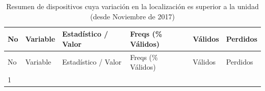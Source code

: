 \documentclass[]{book}
\begin{document}
\begin{longtable}[]{@{}llllll@{}}
\caption{\label{tabs:all-locations-diff-from-november-summary}Resumen de
dispositivos cuya variación en la localización es superior a la unidad
(desde Noviembre de 2017)}\tabularnewline
\toprule
\begin{minipage}[b]{0.05\columnwidth}\raggedright\strut
No\strut
\end{minipage} & \begin{minipage}[b]{0.11\columnwidth}\raggedright\strut
Variable\strut
\end{minipage} & \begin{minipage}[b]{0.29\columnwidth}\raggedright\strut
Estadístico / Valor\strut
\end{minipage} & \begin{minipage}[b]{0.20\columnwidth}\raggedright\strut
Freqs (\% Válidos)\strut
\end{minipage} & \begin{minipage}[b]{0.08\columnwidth}\raggedright\strut
Válidos\strut
\end{minipage} & \begin{minipage}[b]{0.08\columnwidth}\raggedright\strut
Perdidos\strut
\end{minipage}\tabularnewline
\midrule
\endfirsthead
\toprule
\begin{minipage}[b]{0.05\columnwidth}\raggedright\strut
No\strut
\end{minipage} & \begin{minipage}[b]{0.11\columnwidth}\raggedright\strut
Variable\strut
\end{minipage} & \begin{minipage}[b]{0.29\columnwidth}\raggedright\strut
Estadístico / Valor\strut
\end{minipage} & \begin{minipage}[b]{0.20\columnwidth}\raggedright\strut
Freqs (\% Válidos)\strut
\end{minipage} & \begin{minipage}[b]{0.08\columnwidth}\raggedright\strut
Válidos\strut
\end{minipage} & \begin{minipage}[b]{0.08\columnwidth}\raggedright\strut
Perdidos\strut
\end{minipage}\tabularnewline
\midrule
\endhead
\begin{minipage}[t]{0.05\columnwidth}\raggedright\strut
1\strut
\end{minipage} & \begin{minipage}[t]{0.11\columnwidth}\raggedright\strut

\end{minipage}
\end{longtable}
\end{document}
